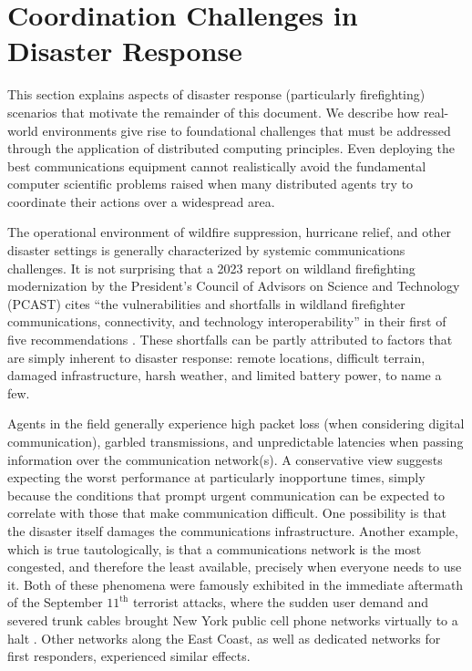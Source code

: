\documentclass[]             %
{NASA}                       %
\theoremstyle{definition}
\begin{document}
\section{Coordination Challenges in Disaster Response}
\label{sec:disaster-response}

This section explains aspects of disaster response (particularly
firefighting) scenarios that motivate the remainder of this
document. We describe how real-world environments give rise to
foundational challenges that must be addressed through the application
of distributed computing principles. Even deploying the best
communications equipment cannot realistically avoid the fundamental
computer scientific problems raised when many distributed agents try
to coordinate their actions over a widespread area.

The operational environment of wildfire suppression, hurricane relief,
and other disaster settings is generally characterized by systemic
communications challenges. It is not surprising that a 2023 report on
wildland firefighting modernization by the President’s Council of
Advisors on Science and Technology (PCAST) cites ``the vulnerabilities
and shortfalls in wildland firefighter communications, connectivity,
and technology interoperability'' in their first of five
recommendations \cite{pcast2023}. These shortfalls can be partly
attributed to factors that are simply inherent to disaster response:
remote locations, difficult terrain, damaged infrastructure, harsh
weather, and limited battery power, to name a few.

Agents in the field generally experience high packet loss (when
considering digital communication), garbled transmissions, and
unpredictable latencies when passing information over the
communication network(s). A conservative view suggests expecting the
worst performance at particularly inopportune times, simply because
the conditions that prompt urgent communication can be expected to
correlate with those that make communication difficult. One
possibility is that the disaster itself damages the communications
infrastructure.  Another example, which is true tautologically, is
that a communications network is the most congested, and therefore the
least available, precisely when everyone needs to use it. Both of
these phenomena were famously exhibited in the immediate aftermath of
the September $11^\textrm{th}$ terrorist attacks, where the sudden
user demand and severed trunk cables brought New York public cell
phone networks virtually to a halt \cite{2011:Reardon}. Other networks
along the East Coast, as well as dedicated networks for first
responders, experienced similar effects.
\end{document}
